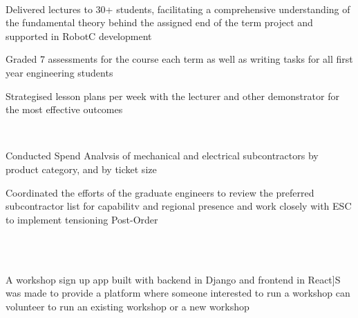 \documentclass[11pt, a4paper]{MagicalCV}
\begin{document}
\begin{minipage}[t]{0.58\textwidth}
 \\
\vspace{\topsep} %
\begin{tightemize}
\item Delivered lectures to 30+ students, facilitating a comprehensive understanding of the fundamental theory behind the assigned end of the term project and supported in RobotC development
\item Graded 7 assessments for the course each term as well as writing tasks for all first year engineering students
\item Strategised lesson plans per week with the lecturer and other demonstrator for the most effective outcomes
\end{tightemize}
\sectionsep

 \\
\vspace{\topsep} %
\begin{tightemize}
\item Conducted Spend Analvsis of mechanical and electrical subcontractors by product category, and by ticket size
\item Coordinated the efforts of the graduate engineers to review the preferred subcontractor list for capabilitv and regional
presence and work closely with ESC to implement tensioning Post-Order
\end{tightemize}
\sectionsep


\end{minipage} 

\newpage
\sectionsep

 \\

 \\

 A workshop sign up app built with backend in Django and frontend in React]S was made to
provide a platform where someone interested to run a workshop can volunteer to run an existing workshop or a new workshop
\sectionsep

 \\
 
\end{document}

